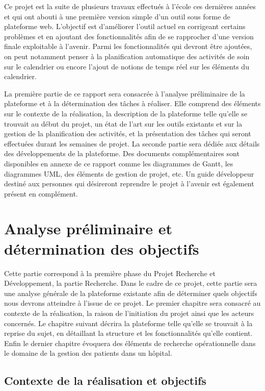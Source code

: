 \documentclass{polytech/polytech}
\begin{document}
Ce projet est la suite de plusieurs travaux effectués à l'école ces dernières années et qui ont abouti à une première version simple d'un outil sous forme de plateforme web. L'objectif est d'améliorer l'outil actuel en corrigeant certains problèmes et en ajoutant des fonctionnalités afin de se rapprocher d'une version finale exploitable à l'avenir. Parmi les fonctionnalités qui devront être ajoutées, on peut notamment penser à la planification automatique des activités de soin sur le calendrier ou encore l'ajout de notions de temps réel sur les éléments du calendrier.

La première partie de ce rapport sera consacrée à l'analyse préliminaire de la plateforme et à la détermination des tâches à réaliser. Elle comprend des éléments sur le contexte de la réalisation, la description de la plateforme telle qu'elle se trouvait au début du projet, un état de l'art sur les outils existants et sur la gestion de la planification des activités, et la présentation des tâches qui seront effectuées durant les semaines de projet. La seconde partie sera dédiée aux détails des développements de la plateforme. Des documents complémentaires sont disponibles en annexe de ce rapport comme les diagrammes de Gantt, les diagrammes UML, des éléments de gestion de projet, etc. Un guide développeur destiné aux personnes qui désireront reprendre le projet à l'avenir est également présent en complément.


\part{Analyse préliminaire et détermination des objectifs}


Cette partie correspond à la première phase du Projet Recherche et Développement, la partie Recherche. Dans le cadre de ce projet, cette partie sera une analyse générale de la plateforme existante afin de déterminer quels objectifs nous devrons atteindre à l'issue de ce projet. Le premier chapitre sera consacré au contexte de la réalisation, la raison de l'initiation du projet ainsi que les acteurs concernés. Le chapitre suivant décrira la plateforme telle qu'elle se trouvait à la reprise du sujet, en détaillant la structure et les fonctionnalités qu'elle contient. Enfin le dernier chapitre évoquera des éléments de recherche opérationnelle dans le domaine de la gestion des patients dans un hôpital. 


\chapter{Contexte de la réalisation et objectifs}
\label{chap:contexte}
\end{document}
